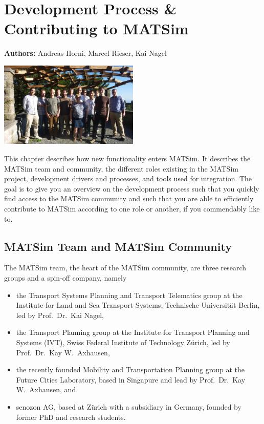 \chapter{Development Process \& Contributing to MATSim}
\label{ch:developmentprocess}

\hfill \textbf{Authors:} Andreas Horni, Marcel Rieser, Kai Nagel

\begin{center} \includegraphics[width=0.5\textwidth, angle=0]{extending/figures/ConceptualMeetingVillaHatt.png} \end{center}

This chapter describes how new functionality enters MATSim. It describes the MATSim team and community, the different roles existing in the MATSim project, development drivers and processes, and tools used for integration. The goal is to give you an overview on the development process such that you quickly find access to the MATSim community and such that you are able to efficiently contribute to MATSim according to one role or another, if you commendably like to.

\section{MATSim Team and MATSim Community}
The MATSim team, the heart of the MATSim community, are three research groups and a spin-off company, namely 
\begin{itemize}
\item the Transport Systems Planning and Transport Telematics group at the Institute for Land and Sea Transport Systems, Technische Universität Berlin, led by Prof.\ Dr.\ Kai Nagel,
\item the Transport Planning group at the Institute for Transport Planning and Systems (IVT), Swiss Federal Institute of Technology Zürich, led by Prof.\ Dr.\ Kay W.\ Axhausen, 
\item the recently founded Mobility and Transportation Planning group at the Future Cities Laboratory, based in Singapure and lead by Prof.\ Dr.\ Kay W.\ Axhausen, and 
\item senozon AG, based at Zürich with a subsidiary in Germany, founded by former PhD and research students. 
\end{itemize}

